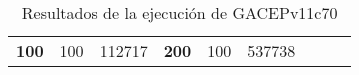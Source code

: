 \begin{table}[H]
\begin{tabular}{|ccrccrccc}
\multicolumn{1}{|c|}{\multirow{-39}{*}{\cellcolor[HTML]{FFFFC7}\textbf{100}}} & \multicolumn{1}{c|}{\multirow{-9}{*}{\cellcolor[HTML]{DDFDFF}100}} & \multicolumn{1}{r|}{\cellcolor[HTML]{DAE8FC}112717}    & \multicolumn{1}{c|}{\multirow{-39}{*}{\cellcolor[HTML]{FFFFC7}\textbf{200}}} & \multicolumn{1}{c|}{\multirow{-10}{*}{\cellcolor[HTML]{DDFDFF}100}} & \multicolumn{1}{r|}{\cellcolor[HTML]{DDFDFF}537738}    &                                                                              &                                                                    &                                                        \\ \cline{1-6}
\end{tabular}
\caption{\label{res:GACEPv11c70}Resultados de la ejecución de GACEPv11c70}
\end{table}

